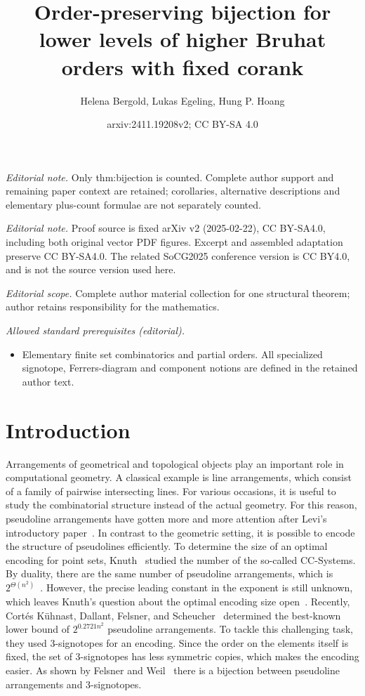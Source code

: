 \documentclass[a4paper,11pt]{amsart}
\title{Order-preserving bijection for lower levels of higher Bruhat orders with fixed corank}
\author{Helena Bergold, Lukas Egeling, Hung P. Hoang}
\date{arxiv:2411.19208v2; CC BY-SA 4.0}
\begin{document}
\maketitle
\noindent\textit{Editorial note.} Only thm:bijection is counted. Complete author support and remaining paper context are retained; corollaries, alternative descriptions and elementary plus-count formulae are not separately counted.\par\medskip
\noindent\textit{Editorial note.} Proof source is fixed arXiv v2 (2025-02-22), CC BY-SA4.0, including both original vector PDF figures. Excerpt and assembled adaptation preserve CC BY-SA4.0. The related SoCG2025 conference version is CC BY4.0, and is not the source version used here.\par\medskip
\noindent\textit{Editorial scope.} Complete author material collection for one structural theorem; author retains responsibility for the mathematics.\par\medskip
\noindent\textit{Allowed standard prerequisites (editorial).}\begin{itemize}
\item Elementary finite set combinatorics and partial orders. All specialized signotope, Ferrers-diagram and component notions are defined in the retained author text.
\end{itemize}\medskip
\section{Introduction}

Arrangements of geometrical and topological objects play an important role in computational geometry. 
A classical example is line arrangements, which consist of a family of pairwise intersecting lines. 
For various occasions, it is useful to study the combinatorial structure instead of the actual geometry. 
For this reason, pseudoline arrangements have gotten more and more attention after Levi's introductory paper~\cite{Levi1926}. 
In contrast to the geometric setting, it is possible to encode the structure of pseudolines efficiently.
To determine the size of an optimal encoding for point sets, Knuth~\cite{Knuth1992} studied the number of the so-called CC-Systems. 
By duality, there are the same number of pseudoline arrangements, which is $2^{\Theta(n^2)}$~\cite{Knuth1992,FelsnerGoodman2017}.
However, the precise leading constant in the exponent is still unknown, which leaves Knuth's question about the optimal encoding size open~\cite{Knuth1992}. 
Recently, Cort\'es Kühnast, Dallant, Felsner, and Scheucher~\cite{KuhnastDFS24} determined the best-known lower bound of $2^{0.2721n^2} $ pseudoline arrangements.
To tackle this challenging task, they used 3-signotopes for an encoding. Since the order on the elements itself is fixed, the set of 3-signotopes has less symmetric copies, which makes the encoding easier. 
As shown by Felsner and Weil~\cite{FelsnerWeil2001} there is a bijection between pseudoline arrangements and 3-signotopes. 
\end{document}
